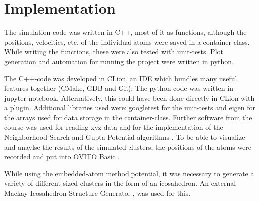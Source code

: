 \chapter{Implementation}
\begin{comment}	
	go about structure of the code 
	-> describe Code structure
		
	-> c++ was used to implement the code (mostly functional)
	-> key atoms container Class which holdes all the Values
	-> most functions were tested with googleTest
\end{comment}

\begin{comment}
code written in c++ most of it pretty functional, classes just used 
for the atoms container which holds the arrays 
while writing it also wrote the unittests with googletest
data aquiered form the code plotted with python
also where large simulations had to be run, called the program from the python code

\end{comment}
The simulation code was written in C++, most of it as functions, although the positions, velocities, etc. of the individual atoms were saved in a container-class.
While writing the functions, these were also tested with unit-tests.
Plot generation and automation for running the project were written in python.

\begin{comment}
developed in CLion which as an integrated git inviroment
Clion builds with Cmake then clang as a compiler
debugger is gdb(nicely hidden)
- additianal bibs where :
	googletest	for unittests
	eigen		for arrays 
- software used form the class itself 
- ovito for visualization
\end{comment}
The C++-code was developed in CLion, an IDE which bundles many useful features together (CMake, GDB and Git).
The python-code was written in jupyter-notebook. Alternatively, this could have been done directly in CLion with a plugin. 
Additional libraries used were: googletest \cite{googletest} for the unit-tests and eigen \cite{eigen} for the arrays used for data storage in the container-class. 
Further software from the course was used for reading xyz-data and for the implementation of the Neighborhood-Search and Gupta-Potential algorithms \cite{molDymCourse}. 
To be able to visualize and anaylse the results of the simulated clusters, the positions of the atoms were recorded and put into OVITO Basic \cite{ovito}.  

While using the embedded-atom method potential, it was necessary to generate a variety of different sized clusters in the form of an icosahedron. An external Mackay Icosahedron Structure Generator \cite{icosader}, was used for this.
\begin{comment}
--
code is structured into the milestones, so an individual milestone can be rerun in case of fuckup
parted into h and cpp files as usual
followed the structure of the milestone
\end{comment}

